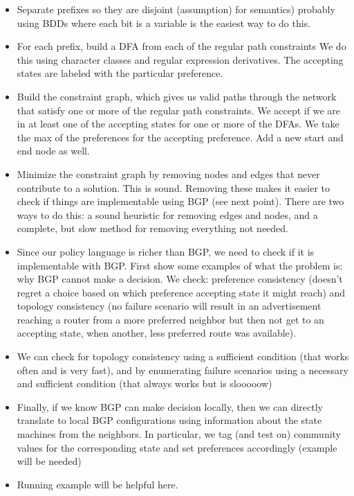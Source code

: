 \documentclass{sigplanconf}
\begin{document}
\begin{itemize}
	\item Separate prefixes so they are disjoint (assumption) for semantics)
		  probably using BDDs where each bit is a variable is the easiest way to do this.
	\item For each prefix, build a DFA from each of the regular path constraints 
		  We do this using character classes and regular expression derivatives.
		  The accepting states are labeled with the particular preference.
	\item Build the constraint graph, which gives us valid paths through the network that satisfy one or 
		  more of the regular path constraints. We accept if we are in at least one of the accepting states 
		  for one or more of the DFAs. We take the max of the preferences for the accepting preference.
		  Add a new start and end node as well.
	\item Minimize the constraint graph by removing nodes and edges that never contribute to a solution. 
		  This is sound. Removing these makes it easier to check if things are implementable using BGP (see next point).
		  There are two ways to do this: a sound heuristic for removing edges and nodes, and a complete, but slow method for 
		  removing everything not needed.
	\item Since our policy language is richer than BGP, we need to check if it is implementable with BGP.
		  First show some examples of what the problem is: why BGP cannot make a decision.
		  We check: preference consistency (doesn't regret a choice based on which preference accepting state it might reach)
		  and topology consistency (no failure scenario will result in an advertisement reaching a router from a more preferred neighbor 
		  but then not get to an accepting state, when another, less preferred route was available).
	\item We can check for topology consistency using a sufficient condition (that works often and is very fast), 
		  and by enumerating failure scenarios using a necessary and sufficient condition (that always works but is slooooow)
	
	\item Finally, if we know BGP can make decision locally, then we can directly translate to local BGP configurations using 
		  information about the state machines from the neighbors. In particular, we tag (and test on) community values for the
		  corresponding state and set preferences accordingly (example will be needed)
	\item Running example will be helpful here.	
\end{itemize}
\end{document}
